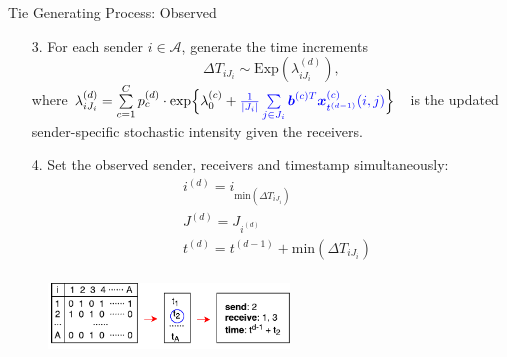 \documentclass[10pt]{beamer}
\theoremstyle{definition}
\theoremstyle{remark}
\begin{document}
\begin{frame}{Tie Generating Process: Observed}
\begin{itemize}
		\item [3.] For each sender $i \in \mathcal{A}$, generate the time increments 
		\footnotesize	\begin{equation*}
		\Delta T_{i{J_i}} \sim \mbox{Exp}(\lambda_{i{J_i}}^{(d)}),
		\end{equation*}\normalsize
		where \footnotesize$\lambda^{(d)}_{iJ_i}= \sum\limits_{c=1}^{C} p^{(d)}_c\cdot\mbox{exp}\Big\{\lambda^{(c)}_0+\textcolor{blue}{\frac{1}{|J_i|}\sum\limits_{j \in J_i} \boldsymbol{b}^{(c)T}\boldsymbol{x}^{(c)}_{t^{(d-1)}}(i, j)}\Big\}\quad$\normalsize is the updated sender-specific stochastic intensity given the receivers.\vspace{0.4cm}
		\item[4.] Set the observed sender, receivers and timestamp simultaneously:
		\footnotesize	\begin{equation*}
		\begin{aligned}
		&i^{(d)} = i_{\mbox{min}(\Delta T_{i{J_i}})} \\
		&J^{(d)} = J_{i^{(d)}}\\
		&t^{(d)} = t^{(d-1)}+\mbox{min}(\Delta T_{i{J_i}})\\
		\end{aligned}
		\end{equation*}
		\normalsize
\end{itemize}
 \begin{figure}
 	\includegraphics[width=0.57\textwidth]{figures/tie.pdf}
 \end{figure}	
\end{frame}
\end{document}
